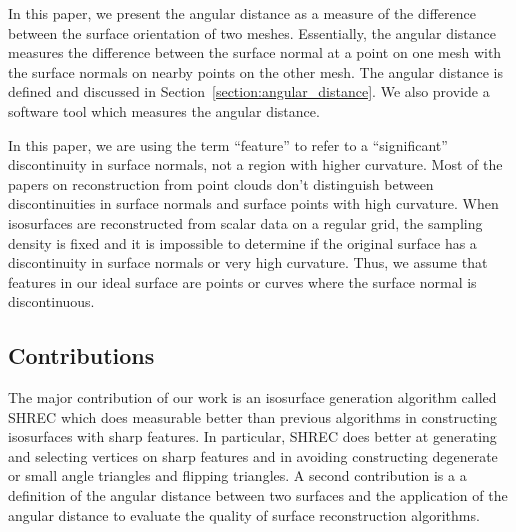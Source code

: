 In this paper, we present the angular distance as a measure
of the difference between the surface orientation of two meshes.
Essentially, the angular distance measures the difference 
between the surface normal at a point on one mesh with the surface normals
on nearby points on the other mesh.
The angular distance is defined and discussed
in Section~\ref{section:angular_distance}.
We also provide a software tool which measures the angular distance.

In this paper, we are using the term ``feature'' to refer 
to a ``significant'' discontinuity in surface normals,
not a region with higher curvature.
Most of the papers on reconstruction from point clouds
don't distinguish between discontinuities in surface normals
and surface points with high curvature.
When isosurfaces are reconstructed from scalar data on a regular grid,
the sampling density is fixed and
it is impossible to determine if the original surface has
a discontinuity in surface normals or very high curvature.
Thus, we assume that features in our ideal surface are
points or curves where the surface normal is discontinuous.


\subsection*{Contributions}

The major contribution of our work is an isosurface generation algorithm
called SHREC which does measurable better than previous algorithms
in constructing isosurfaces with sharp features.
In particular, SHREC does better at generating and selecting vertices 
on sharp features and in avoiding constructing degenerate 
or small angle triangles and flipping triangles.
A second contribution is a a definition of the angular distance 
between two surfaces and the application of the angular distance
to evaluate the quality of surface reconstruction algorithms.

